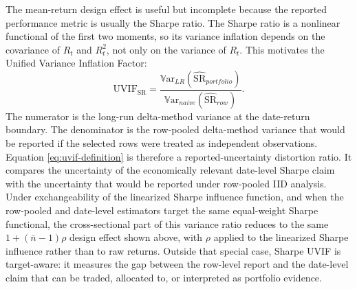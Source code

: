\documentclass[12pt,a4paper]{article}
\newcommand{\Var}{\mathbb{V}\mathrm{ar}}
\newcommand{\SR}{\mathrm{SR}}
\newcommand{\UVIF}{\mathrm{UVIF}}
\begin{document}
The mean-return design effect is useful but incomplete because the
reported performance metric is usually the Sharpe ratio.  The Sharpe
ratio is a nonlinear functional of the first two moments, so its
variance inflation depends on the covariance of \(R_t\) and \(R_t^2\),
not only on the variance of \(R_t\).  This motivates the Unified
Variance Inflation Factor:
\begin{equation}
  \UVIF_{\SR}
  =
  \frac{\Var_{LR}(\widehat{\SR}_{portfolio})}
       {\Var_{naive}(\widehat{\SR}_{row})}.
  \label{eq:uvif-definition}
\end{equation}
The numerator is the long-run delta-method variance at the
date-return boundary.  The denominator is the row-pooled delta-method
variance that would be reported if the selected rows were treated as
independent observations.
Equation \eqref{eq:uvif-definition} is therefore a reported-uncertainty
distortion ratio.  It compares the uncertainty of the economically
relevant date-level Sharpe claim with the uncertainty that would be
reported under row-pooled IID analysis.  Under exchangeability of the
linearized Sharpe influence function, and when the row-pooled and
date-level estimators target the same equal-weight Sharpe functional,
the cross-sectional part of this variance ratio reduces to the same
\(1+(\bar n-1)\rho\) design effect shown above, with \(\rho\) applied to
the linearized Sharpe influence rather than to raw returns.  Outside
that special case, Sharpe UVIF is target-aware: it measures the gap
between the row-level report and the date-level claim that can be
traded, allocated to, or interpreted as portfolio evidence.
\end{document}
